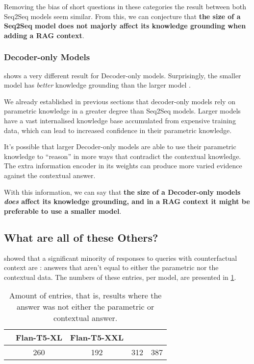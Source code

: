 Removing the bias of short questions in these categories the result between both Seq2Seq models seem similar.
From this, we can conjecture that \textbf{the size of a Seq2Seq model does not majorly affect its knowledge grounding when adding a RAG context}.

\subsubsection{Decoder-only Models}

 shows a very different result for Decoder-only models.
Surprisingly, the smaller model \smallllama{} has \textit{better} knowledge grounding than the larger model \bigllama{}.

We already established in previous sections that decoder-only models rely on parametric knowledge in a greater degree than Seq2Seq models.
Larger models have a vast internalised knowledge base accumulated from expensive training data, which can lead to increased confidence in their parametric knowledge.

It's possible that larger Decoder-only models are able to use their parametric knowledge to ``reason'' in more ways that contradict the contextual knowledge.
The extra information encoder in its weights can produce more varied evidence against the contextual answer.

With this information, we can say that \textbf{the size of a Decoder-only models \textit{does} affect its knowledge grounding, and in a RAG context it might be preferable to use a smaller model}.

\newpage{}
\subsection{What are all of these Others?}

 showed that a significant minority of responses to queries with counterfactual context are \Other{}: answers that aren't equal to either the parametric nor the contextual data.
The numbers of these entries, per model, are presented in \cref{others_list}.

\begin{table}[h]
	\centering
	\footnotesize
	\begin{tabular}{>{\bfseries}l | c c c c}
		\toprule
			& \ttfamily\scriptsize Flan-T5-XL & \ttfamily\scriptsize Flan-T5-XXL & \ttfamily\scriptsize \llamaparbox{} & \ttfamily\scriptsize \bigllamaparbox{} \\
		\midrule
			\Other{} & 260 & 192 & 312 & 387 \\
		\bottomrule
	\end{tabular}
	\caption{Amount of \Other{} entries, that is, results where the answer was not either the parametric or contextual answer.}
	\label{others_list}
\end{table}

